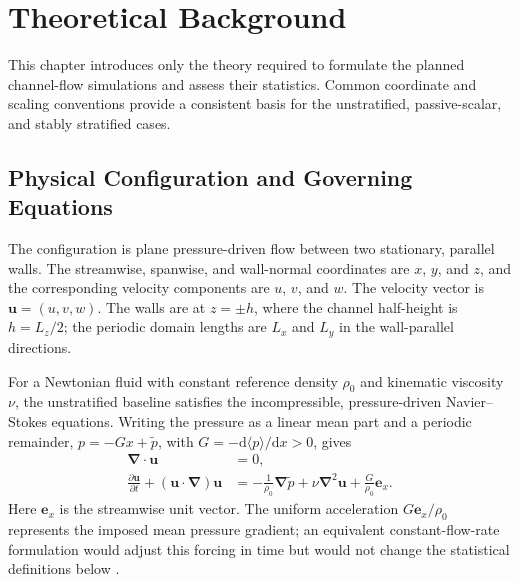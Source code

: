 \chapter{Theoretical Background}
\label{sec:theoretical-background}

This chapter introduces only the theory required to formulate the planned
channel-flow simulations and assess their statistics. Common coordinate and
scaling conventions provide a consistent basis for the unstratified,
passive-scalar, and stably stratified cases.

\section{Physical Configuration and Governing Equations}
\label{sec:physical-configuration-governing-equations}

The configuration is plane pressure-driven flow between two stationary,
parallel walls. The streamwise, spanwise, and wall-normal coordinates are
$x$, $y$, and $z$, and the corresponding velocity components are $u$, $v$,
and $w$. The velocity vector is $\mathbf{u}=(u,v,w)$. The walls are at
$z=\pm h$, where the channel half-height is $h=L_z/2$; the periodic domain
lengths are $L_x$ and $L_y$ in the wall-parallel directions.

For a Newtonian fluid with constant reference density $\rho_0$ and kinematic
viscosity $\nu$, the unstratified baseline satisfies the incompressible,
pressure-driven Navier--Stokes equations. Writing the pressure as a linear
mean part and a periodic remainder, $p=-Gx+\widetilde p$, with
$G=-\mathrm{d}\langle p\rangle/\mathrm{d}x>0$, gives
\begin{equation}
  \begin{aligned}
    \boldsymbol{\nabla}\mathbin{\cdot}\mathbf{u}&=0,\\
    \frac{\partial\mathbf{u}}{\partial t}
      +(\mathbf{u}\mathbin{\cdot}\boldsymbol{\nabla})\mathbf{u}
      &=-\frac{1}{\rho_0}\boldsymbol{\nabla}\widetilde p
        +\nu\boldsymbol{\nabla}^2\mathbf{u}
        +\frac{G}{\rho_0}\mathbf{e}_x .
  \end{aligned}
  \label{eq:baseline-governing-equations}
\end{equation}
Here $\mathbf{e}_x$ is the streamwise unit vector. The uniform acceleration
$G\mathbf{e}_x/\rho_0$ represents the imposed mean pressure gradient; an
equivalent constant-flow-rate formulation would adjust this forcing in time
but would not change the statistical definitions below \cite{pope2000}.

